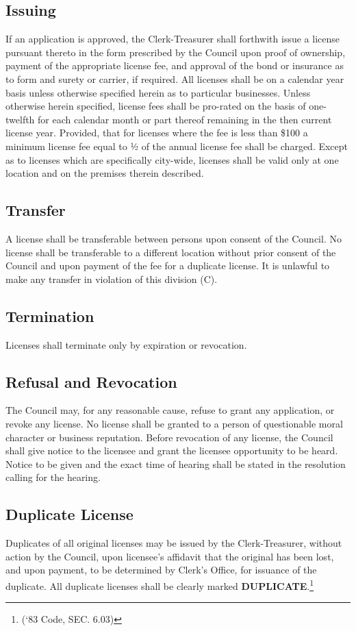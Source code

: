 \subsection{Issuing}
If an application is approved, the Clerk-Treasurer shall forthwith issue a license pursuant thereto in the form prescribed by the Council upon proof of ownership, payment of the appropriate license fee, and approval of the bond or insurance as to form and surety or carrier, if required.  All licenses shall be on a calendar year basis unless otherwise specified herein as to particular businesses.  Unless otherwise herein specified, license fees shall be pro-rated on the basis of one-twelfth for each calendar month or part thereof remaining in the then current license year.  Provided, that for licenses where the fee is less than \$100 a minimum license fee equal to ½ of the annual license fee shall be charged.  Except as to licenses which are specifically city-wide, licenses shall be valid only at one location and on the premises therein described.
\subsection{Transfer}
A license shall be transferable between persons upon consent of the Council.  No license shall be transferable to a different location without prior consent of the Council and upon payment of the fee for a duplicate license.  It is unlawful to make any transfer in violation of this division (C).
\subsection{Termination}
Licenses shall terminate only by expiration or revocation.
\subsection{Refusal and Revocation}
The Council may, for any reasonable cause, refuse to grant any application, or revoke any license.  No license shall be granted to a person of questionable moral character or business reputation.  Before revocation of any license, the Council shall give notice to the licensee and grant the licensee opportunity to be heard.  Notice to be given and the exact time of hearing shall be stated in the resolution calling for the hearing.
\subsection{Duplicate License}
Duplicates of all original licenses may be issued by the Clerk-Treasurer, without action by the Council, upon licensee’s affidavit that the original has been lost, and upon payment, to be determined by Clerk’s Office, for issuance of the duplicate.  All duplicate licenses shall be clearly marked \textbf{DUPLICATE}.\footnote{(‘83 Code, SEC. 6.03)}
